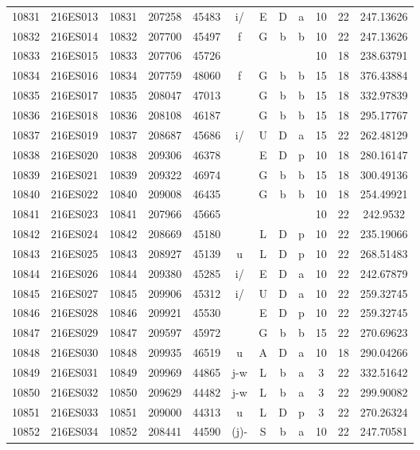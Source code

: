 \begin{tabular}{|*{12}{c|}}
10831 & 216ES013 & 10831 & 207258 & 45483 & i/ & E & D & a & 10 & 22 & 247.13626 \\ 
10832 & 216ES014 & 10832 & 207700 & 45497 & f & G & b & b & 10 & 22 & 247.13626 \\ 
10833 & 216ES015 & 10833 & 207706 & 45726 &  &  &  &  & 10 & 18 & 238.63791 \\ 
10834 & 216ES016 & 10834 & 207759 & 48060 & f & G & b & b & 15 & 18 & 376.43884 \\ 
10835 & 216ES017 & 10835 & 208047 & 47013 &  & G & b & b & 15 & 18 & 332.97839 \\ 
10836 & 216ES018 & 10836 & 208108 & 46187 &  & G & b & b & 15 & 18 & 295.17767 \\ 
10837 & 216ES019 & 10837 & 208687 & 45686 & i/ & U & D & a & 15 & 22 & 262.48129 \\ 
10838 & 216ES020 & 10838 & 209306 & 46378 &  & E & D & p & 10 & 18 & 280.16147 \\ 
10839 & 216ES021 & 10839 & 209322 & 46974 &  & G & b & b & 15 & 18 & 300.49136 \\ 
10840 & 216ES022 & 10840 & 209008 & 46435 &  & G & b & b & 10 & 18 & 254.49921 \\ 
10841 & 216ES023 & 10841 & 207966 & 45665 &  &  &  &  & 10 & 22 & 242.9532 \\ 
10842 & 216ES024 & 10842 & 208669 & 45180 &  & L & D & p & 10 & 22 & 235.19066 \\ 
10843 & 216ES025 & 10843 & 208927 & 45139 & u & L & D & p & 10 & 22 & 268.51483 \\ 
10844 & 216ES026 & 10844 & 209380 & 45285 & i/ & E & D & a & 10 & 22 & 242.67879 \\ 
10845 & 216ES027 & 10845 & 209906 & 45312 & i/ & U & D & a & 10 & 22 & 259.32745 \\ 
10846 & 216ES028 & 10846 & 209921 & 45530 &  & E & D & p & 10 & 22 & 259.32745 \\ 
10847 & 216ES029 & 10847 & 209597 & 45972 &  & G & b & b & 15 & 22 & 270.69623 \\ 
10848 & 216ES030 & 10848 & 209935 & 46519 & u & A & D & a & 10 & 18 & 290.04266 \\ 
10849 & 216ES031 & 10849 & 209969 & 44865 & j-w & L & b & a & 3 & 22 & 332.51642 \\ 
10850 & 216ES032 & 10850 & 209629 & 44482 & j-w & L & b & a & 3 & 22 & 299.90082 \\ 
10851 & 216ES033 & 10851 & 209000 & 44313 & u & L & D & p & 3 & 22 & 270.26324 \\ 
10852 & 216ES034 & 10852 & 208441 & 44590 & (j)- & S & b & a & 10 & 22 & 247.70581 \\ 

\end{tabular}
